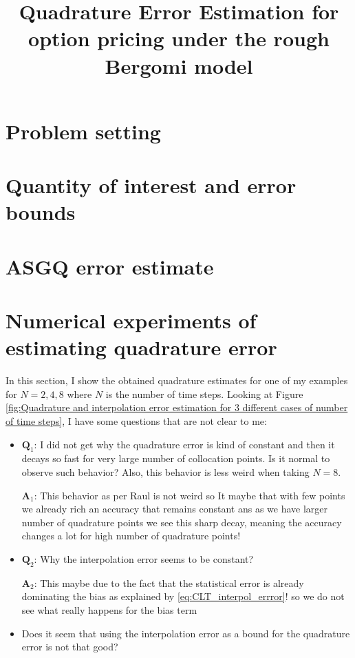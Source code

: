 \documentclass[11pt]{article}
\title{Quadrature Error Estimation  for option pricing under the rough Bergomi model}
\begin{document}
\section{Problem setting}\label{sec:Problem setting}

 
\section{Quantity of interest and error bounds}\label{sec:Quantity of interest and error bounds }


\section{ASGQ error estimate}\label{sec:MISC error estimate}


\section{Numerical experiments of estimating quadrature error}\label{sec:Numerical tests}
In this section, I show the obtained quadrature estimates for one of my examples for $N=2,4,8$ where $N$ is the number of time steps.  Looking at Figure \ref{fig:Quadrature and interpolation error estimation for 3 different cases of number of time steps}, I have some questions  that are not clear to me:
\begin{itemize}
\item $\mathbf{Q}_1$: I did not get why the quadrature error is kind of constant and then it decays so fast for very large number of collocation points. Is it normal to observe such behavior? Also, this behavior is less weird when taking $N=8$.

 $\mathbf{A}_1$: This behavior as per Raul is not weird so It maybe that with few points we already rich an accuracy that remains constant ans as we have larger number of quadrature points we see this sharp decay, meaning the accuracy changes a lot for high number of quadrature points!

\item  $\mathbf{Q}_2$: Why the interpolation error seems to be constant?

 $\mathbf{A}_2$: This maybe due to the fact that the statistical error is already dominating the bias  as explained by \eqref{eq:CLT_interpol_errror}! so we do not see what really happens for the bias term

\item Does it seem that using the interpolation error as a bound for the quadrature error is not that good?
\end{itemize}
\end{document}
